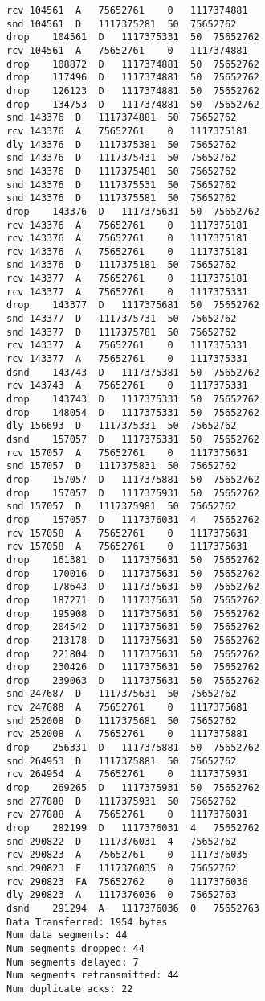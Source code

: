 \documentclass[a4paper]{article}
\begin{document}
\begin{lstlisting}
rcv	104561	A	75652761	0	1117374881
snd	104561	D	1117375281	50	75652762
drop	104561	D	1117375331	50	75652762
rcv	104561	A	75652761	0	1117374881
drop	108872	D	1117374881	50	75652762
drop	117496	D	1117374881	50	75652762
drop	126123	D	1117374881	50	75652762
drop	134753	D	1117374881	50	75652762
snd	143376	D	1117374881	50	75652762
rcv	143376	A	75652761	0	1117375181
dly	143376	D	1117375381	50	75652762
snd	143376	D	1117375431	50	75652762
snd	143376	D	1117375481	50	75652762
snd	143376	D	1117375531	50	75652762
snd	143376	D	1117375581	50	75652762
drop	143376	D	1117375631	50	75652762
rcv	143376	A	75652761	0	1117375181
rcv	143376	A	75652761	0	1117375181
rcv	143376	A	75652761	0	1117375181
snd	143376	D	1117375181	50	75652762
rcv	143377	A	75652761	0	1117375181
rcv	143377	A	75652761	0	1117375331
drop	143377	D	1117375681	50	75652762
snd	143377	D	1117375731	50	75652762
snd	143377	D	1117375781	50	75652762
rcv	143377	A	75652761	0	1117375331
rcv	143377	A	75652761	0	1117375331
dsnd	143743	D	1117375381	50	75652762
rcv	143743	A	75652761	0	1117375331
drop	143743	D	1117375331	50	75652762
drop	148054	D	1117375331	50	75652762
dly	156693	D	1117375331	50	75652762
dsnd	157057	D	1117375331	50	75652762
rcv	157057	A	75652761	0	1117375631
snd	157057	D	1117375831	50	75652762
drop	157057	D	1117375881	50	75652762
drop	157057	D	1117375931	50	75652762
snd	157057	D	1117375981	50	75652762
drop	157057	D	1117376031	4	75652762
rcv	157058	A	75652761	0	1117375631
rcv	157058	A	75652761	0	1117375631
drop	161381	D	1117375631	50	75652762
drop	170016	D	1117375631	50	75652762
drop	178643	D	1117375631	50	75652762
drop	187271	D	1117375631	50	75652762
drop	195908	D	1117375631	50	75652762
drop	204542	D	1117375631	50	75652762
drop	213178	D	1117375631	50	75652762
drop	221804	D	1117375631	50	75652762
drop	230426	D	1117375631	50	75652762
drop	239063	D	1117375631	50	75652762
snd	247687	D	1117375631	50	75652762
rcv	247688	A	75652761	0	1117375681
snd	252008	D	1117375681	50	75652762
rcv	252008	A	75652761	0	1117375881
drop	256331	D	1117375881	50	75652762
snd	264953	D	1117375881	50	75652762
rcv	264954	A	75652761	0	1117375931
drop	269265	D	1117375931	50	75652762
snd	277888	D	1117375931	50	75652762
rcv	277888	A	75652761	0	1117376031
drop	282199	D	1117376031	4	75652762
snd	290822	D	1117376031	4	75652762
rcv	290823	A	75652761	0	1117376035
snd	290823	F	1117376035	0	75652762
rcv	290823	FA	75652762	0	1117376036
dly	290823	A	1117376036	0	75652763
dsnd	291294	A	1117376036	0	75652763
Data Transferred: 1954 bytes
Num data segments: 44
Num segments dropped: 44
Num segments delayed: 7
Num segments retransmitted: 44
Num duplicate acks: 22
\end{lstlisting}
\end{document}
